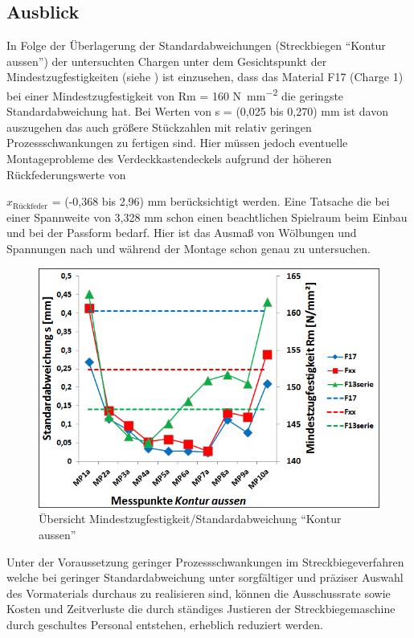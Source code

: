 \documentclass[12pt,a4paper,parskip,twoside,BCOR5mm,headsepline]{scrartcl}
\begin{document}
\begin{description*}
\begin{description}
\end{description}










\newpage

\subsection{Ausblick}
In Folge der Überlagerung der Standardabweichungen (Streckbiegen "`Kontur aussen"') der untersuchten Chargen unter dem Gesichtspunkt der Mindestzugfestigkeiten (siehe ) ist einzusehen, dass das Material F17 (Charge 1) bei einer Mindestzugfestigkeit von Rm = 160  \si{\newton\per\milli\meter\squared}  die geringste Standardabweichung hat. Bei Werten von s = (0,025  bis 0,270) \si{\milli\meter}  ist davon auszugehen das auch größere Stückzahlen mit relativ geringen Prozessschwankungen zu fertigen sind. Hier müssen jedoch eventuelle Montageprobleme des Verdeckkastendeckels aufgrund der höheren Rückfederungswerte von {$x_{\text{Rückfeder}}$ = (-0,368  bis 2,96) \si{\milli\meter} berücksichtigt werden. Eine Tatsache die bei einer Spannweite von 3,328 \si{\milli\meter} schon einen beachtlichen Spielraum beim Einbau und bei der Passform bedarf.  %
Hier ist das Ausmaß von Wölbungen und Spannungen nach und während der Montage schon genau zu untersuchen.

\begin{figure}[hbtp]
\centering
\includegraphics[width=.8\textwidth]{standzugrel}
\caption{Übersicht Mindestzugfestigkeit/Standardabweichung "`Kontur aussen"'}
\label{fig:standzugrel}
\end{figure} 


Unter der Voraussetzung geringer Prozessschwankungen im Streckbiegeverfahren welche bei geringer Standardabweichung unter sorgfältiger und präziser Auswahl des Vormaterials durchaus zu realisieren sind, können die Ausschussrate sowie Kosten und Zeitverluste die durch ständiges Justieren der Streckbiegemaschine durch geschultes Personal entstehen, erheblich reduziert werden.

}
\end{description*}
\end{document}
